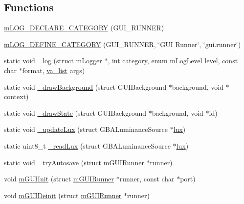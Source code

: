\subsection*{Functions}
\begin{DoxyCompactItemize}
\item 
\mbox{\hyperlink{gui-runner_8c_a1691ada5f1c25e7c588dcdf625e77dd2}{m\+L\+O\+G\+\_\+\+D\+E\+C\+L\+A\+R\+E\+\_\+\+C\+A\+T\+E\+G\+O\+RY}} (G\+U\+I\+\_\+\+R\+U\+N\+N\+ER)
\item 
\mbox{\hyperlink{gui-runner_8c_ac8e8b5efb8fe0ea133e0e14234e29125}{m\+L\+O\+G\+\_\+\+D\+E\+F\+I\+N\+E\+\_\+\+C\+A\+T\+E\+G\+O\+RY}} (G\+U\+I\+\_\+\+R\+U\+N\+N\+ER, \char`\"{}G\+UI Runner\char`\"{}, \char`\"{}gui.\+runner\char`\"{})
\item 
static void \mbox{\hyperlink{gui-runner_8c_abd0ecb64e5e72d771823f2e8aa966fc6}{\+\_\+log}} (struct m\+Logger $\ast$, \mbox{\hyperlink{ioapi_8h_a787fa3cf048117ba7123753c1e74fcd6}{int}} category, enum m\+Log\+Level level, const char $\ast$format, \mbox{\hyperlink{__builder_8h_a2b7adf9b9fd4a58a693dc7cfba5b9006}{va\+\_\+list}} args)
\item 
static void \mbox{\hyperlink{gui-runner_8c_a85eaa5595602fd13a318e9dd12bb6f50}{\+\_\+draw\+Background}} (struct G\+U\+I\+Background $\ast$background, void $\ast$context)
\item 
static void \mbox{\hyperlink{gui-runner_8c_a6d8815542c91f5581f48b3c11ced7d14}{\+\_\+draw\+State}} (struct G\+U\+I\+Background $\ast$background, void $\ast$id)
\item 
static void \mbox{\hyperlink{gui-runner_8c_a1a8cb97eac74d065473cb0b7554c72ca}{\+\_\+update\+Lux}} (struct G\+B\+A\+Luminance\+Source $\ast$\mbox{\hyperlink{libretro_8c_ac900fbc81aae58456e1bd917614ec9b9}{lux}})
\item 
static uint8\+\_\+t \mbox{\hyperlink{gui-runner_8c_af64856302df899dfbfabdc3d70ab87bf}{\+\_\+read\+Lux}} (struct G\+B\+A\+Luminance\+Source $\ast$\mbox{\hyperlink{libretro_8c_ac900fbc81aae58456e1bd917614ec9b9}{lux}})
\item 
static void \mbox{\hyperlink{gui-runner_8c_a9a5743d49a1e798b2bd55145d96b438d}{\+\_\+try\+Autosave}} (struct \mbox{\hyperlink{structm_g_u_i_runner}{m\+G\+U\+I\+Runner}} $\ast$runner)
\item 
void \mbox{\hyperlink{gui-runner_8c_a95b3becf7824ec02882a9db0686ce3a3}{m\+G\+U\+I\+Init}} (struct \mbox{\hyperlink{structm_g_u_i_runner}{m\+G\+U\+I\+Runner}} $\ast$runner, const char $\ast$port)
\item 
void \mbox{\hyperlink{gui-runner_8c_a678712d99d73e15cac15d188ea82d5d8}{m\+G\+U\+I\+Deinit}} (struct \mbox{\hyperlink{structm_g_u_i_runner}{m\+G\+U\+I\+Runner}} $\ast$runner)

\end{DoxyCompactItemize}
